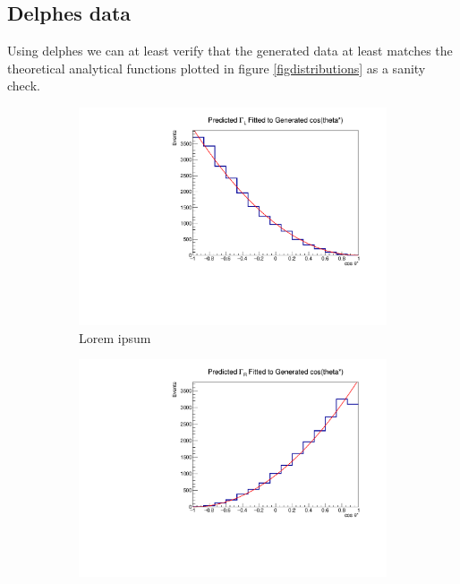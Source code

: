 \documentclass[12pt,a4paper]{article}
\begin{document}
\subsection{Delphes data}
Using delphes we can at least verify that the generated data at least matches
the theoretical analytical functions plotted in figure \ref{figdistributions} as
a sanity check. %
\begin{figure}[t!]
    \centering
    \begin{subfigure}[t]{0.5\textwidth}
        \centering
        \includegraphics[width=1.0\textwidth]{figures/delphes_genL}
        \caption{Lorem ipsum}
    \end{subfigure}%
    \begin{subfigure}[t]{0.5\textwidth}
        \centering
        \includegraphics[width=1.0\textwidth]{figures/delphes_genR}

\end{subfigure}
\end{figure}
\end{document}
